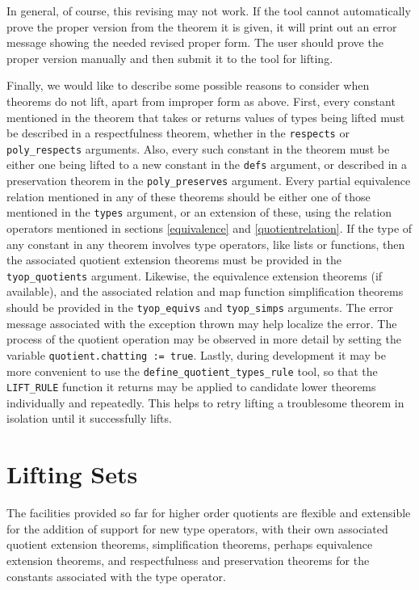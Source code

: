 \documentclass[envcountsame,runningheads]{llncs}
\begin{document}
In general, of course, this revising may not work.
If the tool cannot automatically prove the proper version from the theorem
it is given, it will print out an error message showing the needed revised
proper form.  The user should prove the proper version manually
and then submit
it
to the tool for lifting.

Finally, we would like to describe some possible reasons to consider
when theorems do not lift, apart from improper form as above.  First,
every constant mentioned in the theorem that takes or returns values
of types being lifted must be described in a respectfulness theorem,
whether in the {\tt respects} or {\tt poly\_respects} arguments.
Also, every such constant in the theorem
must be either one being lifted to a new constant in the {\tt defs} argument,
or described in a preservation theorem in the {\tt poly\_preserves} argument.
Every partial equivalence relation mentioned in any of these theorems
should be either one of those mentioned in the {\tt types} argument,
or an extension of these,
using the relation operators mentioned in sections
\ref{equivalence} and
\ref{quotientrelation}.
If the type of any constant in any theorem
involves type operators, like lists or functions, then the associated
quotient extension theorems must be provided in the
{\tt tyop\_quotients} argument.
Likewise, the equivalence extension theorems (if available),
and the associated relation and map function simplification theorems
should be provided
in the {\tt tyop\_equivs} and {\tt tyop\_simps} arguments.
The error message associated with the exception thrown may help localize
the error.
The process of the quotient operation may be observed in more detail
by setting the variable {\tt quotient.chatting := true}.
Lastly, during development it may be more convenient to use the
{\tt define\_quotient\_types\_rule} tool, so that the {\tt LIFT\_RULE}
function it returns may be applied to candidate lower theorems individually
and repeatedly.  This helps to retry lifting a troublesome theorem
in isolation until it successfully lifts.


%
\section{Lifting Sets}
%
\label{liftingsets}

The facilities provided so far for higher order quotients are flexible
and extensible for the addition of support for new type operators, with
their own associated quotient extension theorems, simplification theorems,
perhaps equivalence extension theorems, and respectfulness and
preservation theorems for the
constants associated with the type operator.
\end{document}
